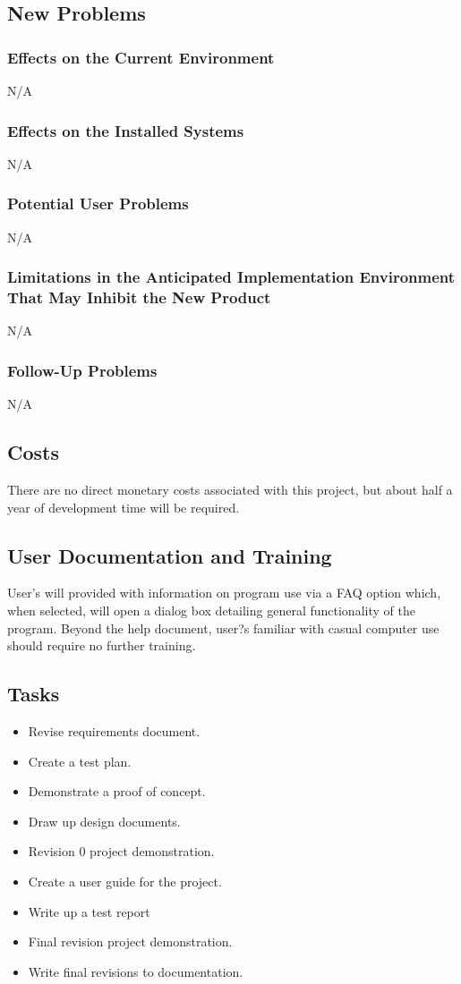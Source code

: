 \subsection{New Problems}
\subsubsection{Effects on the Current Environment}
N/A
\subsubsection{Effects on the Installed Systems}
N/A
\subsubsection{Potential User Problems}
N/A
\subsubsection{Limitations in the Anticipated Implementation Environment That 
May Inhibit the New Product}
N/A
\subsubsection{Follow-Up Problems}
N/A
\subsection{Costs}
There are no direct monetary costs associated with this project, but about half a year of development
time will be required.\\

\subsection{User Documentation and Training}
User's will provided with information on program use via a FAQ option which, 
when selected, will open a dialog box detailing general functionality of the 
program. Beyond the help document, user?s familiar with casual computer use 
should require no further training.\\

\subsection{Tasks}
\begin{itemize}
	\item Revise requirements document.
	\item Create a test plan.
	\item Demonstrate a proof of concept.
	\item Draw up design documents.
	\item Revision 0 project demonstration.
	\item Create a user guide for the project.
	\item Write up a test report
	\item Final revision project demonstration.
	\item Write final revisions to documentation.
\end{itemize}

